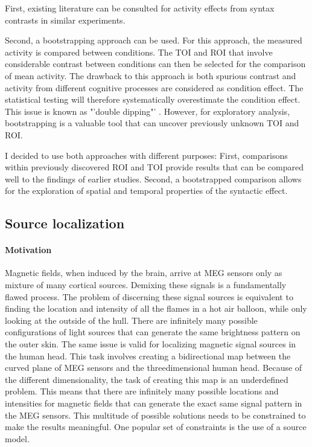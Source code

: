 First, existing literature can be consulted for activity effects from syntax contrasts in similar experiments.

Second, a bootstrapping approach can be used.
For this approach, the measured activity is compared between conditions.
The TOI and ROI that involve considerable contrast between conditions can then be selected for the comparison of mean activity.
The drawback to this approach is both spurious contrast and activity from different cognitive processes are considered as condition effect.
The statistical testing will therefore systematically overestimate the condition effect.
This issue is known as "'double dipping"' \cite{1.5.Kriegeskorte}.
However, for exploratory analysis, bootstrapping is a valuable tool that can uncover previously unknown TOI and ROI.

I decided to use both approaches with different purposes:
First, comparisons within previously discovered ROI and TOI provide results that can be compared well to the findings of earlier studies.
Second, a bootstrapped comparison allows for the exploration of spatial and temporal properties of the syntactic effect.

\subsection{Source localization}

\paragraph{Motivation}
Magnetic fields, when induced by the brain, arrive at MEG sensors only as mixture of many cortical sources.
Demixing these signals is a fundamentally flawed process.
The problem of discerning these signal sources is equivalent to finding the location and intensity of all the flames in a hot air balloon, while only looking at the outside of the hull.
There are infinitely many possible configurations of light sources that can generate the same brightness pattern on the outer skin.
The same issue is valid for localizing magnetic signal sources in the human head.
This task involves creating a bidirectional map between the curved plane of MEG sensors and the threedimensional human head.
Because of the different dimensionality, the task of creating this map is an underdefined problem.
This means that there are infinitely many possible locations and intensities for magnetic fields that can generate the exact same signal pattern in the MEG sensors.
This multitude of possible solutions needs to be constrained to make the results meaningful.
One popular set of constraints is the use of a source model.

